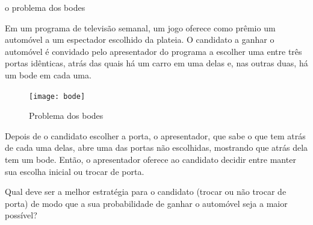 \clearpage
{}
\label{regrasbasicaspropriedades}\begin{task}{o problema dos bodes}


Em um programa de televisão semanal, um jogo oferece como prêmio um automóvel a um espectador escolhido da plateia. O candidato a ganhar o automóvel é convidado pelo apresentador do programa a escolher uma entre três portas idênticas, atrás das quais há um carro em uma delas e, nas outras duas, há um bode em cada uma.

\begin{figure}[H]
\centering

\noindent\texttt{[image: bode]}
\caption{Problema dos bodes}
\end{figure}


Depois de o candidato escolher a porta, o apresentador, que sabe o que tem atrás de cada uma delas, abre uma das portas não escolhidas, mostrando que atrás dela tem um bode. Então, o apresentador oferece ao candidato decidir entre manter sua escolha inicial ou trocar de porta.

Qual deve ser a melhor estratégia para o candidato (trocar ou não trocar de porta) de modo que a sua probabilidade de ganhar o automóvel seja a maior possível?
\end{task}
